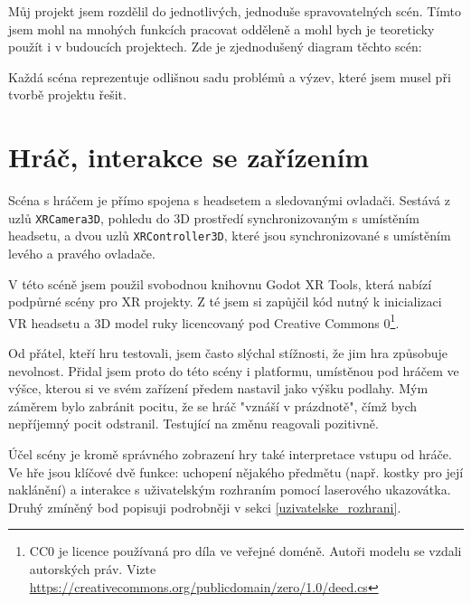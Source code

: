 \begin{samepage}
  Můj projekt jsem rozdělil do jednotlivých, jednoduše spravovatelných scén. Tímto jsem mohl na mnohých funkcích pracovat odděleně a mohl bych je teoreticky použít i v budoucích projektech. Zde je zjednodušený diagram těchto scén:

  \vspace{0.3cm}
  \renewcommand\DTstyle{\rmfamily}

  Každá scéna reprezentuje odlišnou sadu problémů a výzev, které jsem musel při tvorbě projektu řešit.
\end{samepage}

\section{Hráč, interakce se zařízením}

Scéna s hráčem je přímo spojena s headsetem a sledovanými ovladači. Sestává z uzlů \texttt{XRCamera3D}, pohledu do 3D prostředí synchronizovaným s umístěním headsetu, a dvou uzlů \texttt{XRController3D}, které jsou synchronizované s umístěním levého a pravého ovladače.

V této scéně jsem použil svobodnou knihovnu Godot XR Tools, která nabízí podpůrné scény pro XR projekty. Z té jsem si zapůjčil kód nutný k inicializaci VR headsetu a 3D model ruky licencovaný pod Creative Commons 0\footnote{CC0 je licence používaná pro díla ve veřejné doméně. Autoři modelu se vzdali autorských práv. Vizte \url{https://creativecommons.org/publicdomain/zero/1.0/deed.cs}}.

Od přátel, kteří hru testovali, jsem často slýchal stížnosti, že jim hra způsobuje nevolnost. Přidal jsem proto do této scény i platformu, umístěnou pod hráčem ve výšce, kterou si ve svém zařízení předem nastavil jako výšku podlahy. Mým záměrem bylo zabránit pocitu, že se hráč "vznáší v prázdnotě", čímž bych nepříjemný pocit odstranil. Testující na změnu reagovali pozitivně. 

Účel scény je kromě správného zobrazení hry také interpretace vstupu od hráče. Ve hře jsou klíčové dvě funkce: uchopení nějakého předmětu (např. kostky pro její naklánění) a interakce s uživatelským rozhraním pomocí laserového ukazovátka. Druhý zmíněný bod popisuji podrobněji v sekci \ref{uzivatelske_rozhrani}.

